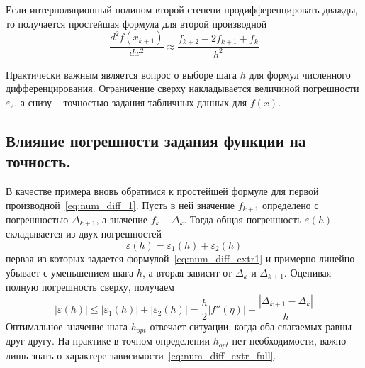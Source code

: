 Если интерполяционный полином второй степени продифференцировать дважды, то получается
простейшая формула для второй производной
\begin{equation}
    \frac{d^2 f(x_{k+1})}{dx^2} \approx \frac{f_{k+2} - 2f_{k+1} + f_k}{h^2}
\end{equation}
\vspace{10pt}

Практически важным является вопрос о выборе шага $h$ для формул численного дифференцирования.
Ограничение сверху накладывается величиной погрешности $\varepsilon_2$, а снизу --
точностью задания табличных данных для $f(x)$.

\subsection{Влияние погрешности задания функции на точность.}
В качестве примера вновь обратимся к простейшей формуле для первой производной~\eqref{eq:num_diff_1}.
Пусть в ней значение $f_{k+1}$ определено с погрешностью $\Delta_{k+1}$, а значение $f_k$ -- $\Delta_k$.
Тогда общая погрешность $\varepsilon(h)$ складывается из двух погрешностей
\begin{equation*}
    \varepsilon(h) = \varepsilon_1(h) + \varepsilon_2(h)
\end{equation*}
первая из которых задается формулой~\eqref{eq:num_diff_extr1} и примерно линейно убывает
с уменьшением шага $h$, а вторая зависит от $\Delta_k$ и $\Delta_{k+1}$. Оценивая
полную погрешность сверху, получаем
\begin{equation}
    \left| \varepsilon(h) \right| \leq \left| \varepsilon_1(h) \right| + \left| \varepsilon_2(h) \right| = \frac{h}{2} \left| f''(\eta) \right| + \frac{\left| \Delta_{k+1} - \Delta_k \right|}{h} \label{eq:num_diff_extr_full}
\end{equation}
Оптимальное значение шага $h_{opt}$ отвечает ситуации, когда оба слагаемых равны друг другу. На практике в точном
определении $h_{opt}$ нет необходимости, важно лишь знать о характере зависимости~\eqref{eq:num_diff_extr_full}.
